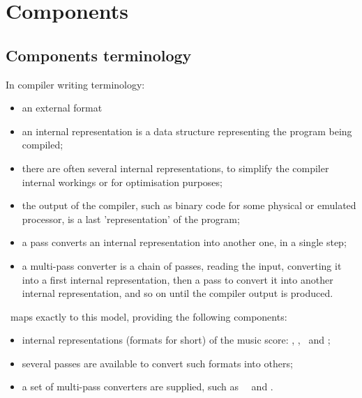 



\chapter{Components}


\section{Components terminology}

In compiler writing terminology:
\begin{itemize}
\item an external format %
\item an internal representation is a data structure representing the program being compiled;
\item there are often several internal representations, to simplify the compiler internal workings or for optimisation purposes;
\item the output of the compiler, such as binary code for some physical or emulated processor, is a last 'representation' of the program;
\item a pass converts an internal representation into another one, in a single step;
\item a multi-pass converter is a chain of passes, reading the input, converting it into a first internal representation, then a pass to convert it into another internal representation, and so on until the compiler output is produced.
\end{itemize}

\mf\ maps exactly to this model, providing the following components:
\begin{itemize}
\item internal representations (formats for short) of the music score: \msrRepr, \lpsrRepr, \bsrRepr\ and \mxsrRepr;
\item several passes are available to convert such formats into others;
\item a set of multi-pass converters are supplied, such as \xmlToLy\, \xmlToXml\ and \msdLangConv.%
\end{itemize}

